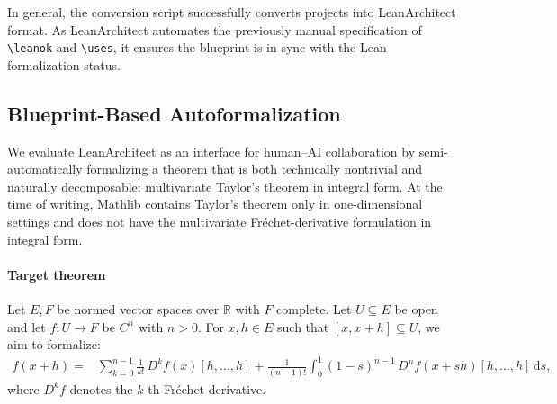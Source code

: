 \documentclass{article}
\newcommand{\leanarchitect}{LeanArchitect\xspace}
\newcommand\latexcode{\lstinline[language={[latex]tex},keywordstyle=\ttfamily\color{black}]}
\begin{document}
In general, the conversion script successfully converts projects into \leanarchitect format. As \leanarchitect automates the previously manual specification of \latexcode{\leanok} and \latexcode{\uses}, it ensures the blueprint is in sync with the Lean formalization status.

\subsection{Blueprint-Based Autoformalization}


We evaluate LeanArchitect as an interface for human--AI collaboration by semi-automatically formalizing a theorem that is both technically nontrivial and naturally decomposable: multivariate Taylor's theorem in integral form. At the time of writing, Mathlib contains Taylor's theorem only in one-dimensional settings and does not have the multivariate Fr\'echet-derivative formulation in integral form.%

\paragraph{Target theorem}
Let $E, F$ be normed vector spaces over $\mathbb{R}$ with $F$ complete. Let $U \subseteq E$ be open and let $f : U \to F$ be $C^n$ with $n>0$. For $x,h \in E$ such that $[x,x+h] \subseteq U$, we aim to formalize:
\begin{align*}
f(x+h) ={}& \sum_{k=0}^{n-1}\frac{1}{k!}\, D^k f(x)[h,\dots,h]
+ \frac{1}{(n-1)!}\int_0^1(1-s)^{n-1}\,D^n f(x+sh)[h,\dots,h]\,\mathrm{d}s,
\end{align*}
where $D^k f$ denotes the $k$-th Fr\'echet derivative.
\end{document}
